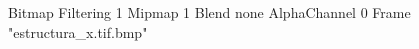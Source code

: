 {Bitmap
	{Filtering 1}
	{Mipmap 1}
	{Blend none}
	{AlphaChannel 0}
	{Frame "estructura_x.tif.bmp"}
}
